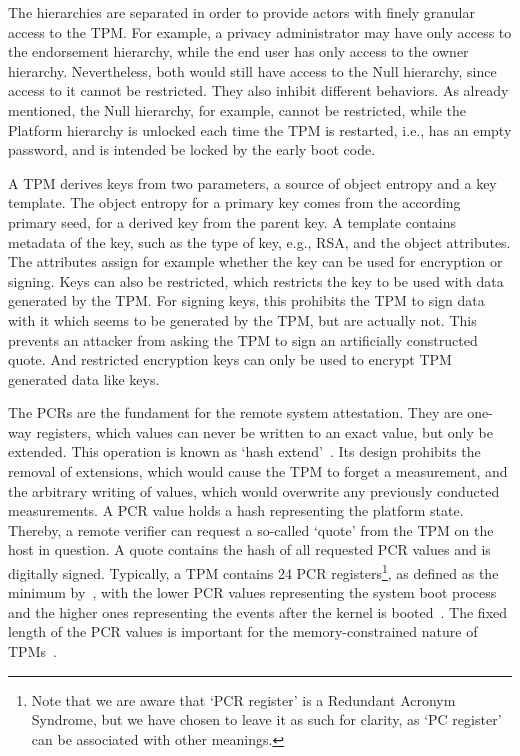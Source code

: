 The hierarchies are separated in order to provide actors with finely granular access to the TPM\@.
For example, a privacy administrator may have only access to the endorsement hierarchy, while the end user has only access to the owner hierarchy.
Nevertheless, both would still have access to the Null hierarchy, since access to it cannot be restricted.
They also inhibit different behaviors.
As already mentioned, the Null hierarchy, for example, cannot be restricted, while the Platform hierarchy is unlocked each time the TPM is restarted, i.e., has an empty password, and is intended be locked by the early boot code.

A TPM derives keys from two parameters, a source of object entropy and a key template.
The object entropy for a primary key comes from the according primary seed, for a derived key from the parent key.
A template contains metadata of the key, such as the type of key, e.g., RSA, and the object attributes.
The attributes assign for example whether the key can be used for encryption or signing.
Keys can also be restricted, which restricts the key to be used with data generated by the TPM\@.
For signing keys, this prohibits the TPM to sign data with it which seems to be generated by the TPM, but are actually not.
This prevents an attacker from asking the TPM to sign an artificially constructed quote.
And restricted encryption keys can only be used to encrypt TPM generated data like keys.


The \acp{PCR} are the fundament for the remote system attestation. They are one-way registers, which values can never be written to an exact value, but only be extended.
This operation is known as `hash extend'~\cite{Arthur2015}.
Its design prohibits the removal of extensions, which would cause the TPM to forget a measurement, and the arbitrary writing of values, which would overwrite any previously conducted measurements.
A PCR value holds a hash representing the platform state.
Thereby, a remote verifier can request a so-called `quote' from the TPM on the host in question.
A quote contains the hash of all requested PCR values and is digitally signed.
Typically, a TPM contains 24 PCR registers\footnote{Note that we are aware that `PCR register' is a Redundant Acronym Syndrome, but we have chosen to leave it as such for clarity, as `PC register' can be associated with other meanings.}, as defined as the minimum by~\cite{tcgPcClient}, with the lower PCR values representing the system boot process and the higher ones representing the events after the kernel is booted~\cite{Arthur2015}.
The fixed length of the \ac{PCR} values is important for the memory-constrained nature of TPMs~\cite{Arthur2015}.

